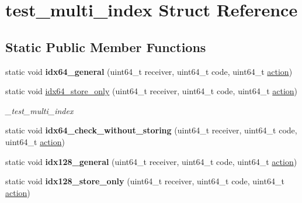 \hypertarget{structtest__multi__index}{}\section{test\+\_\+multi\+\_\+index Struct Reference}
\label{structtest__multi__index}
\subsection*{Static Public Member Functions}
\begin{DoxyCompactItemize}
\item 
\mbox{\label{structtest__multi__index_a7244f1007c22735c54df08b3b64c81fa}} 
static void {\bfseries idx64\+\_\+general} (uint64\+\_\+t receiver, uint64\+\_\+t code, uint64\+\_\+t \mbox{\hyperlink{structaacio_1_1action}{action}})
\item 
\mbox{\label{structtest__multi__index_a41a93c5b54e6c71f880b01b307ab96f7}} 
static void \mbox{\hyperlink{structtest__multi__index_a41a93c5b54e6c71f880b01b307ab96f7}{idx64\+\_\+store\+\_\+only}} (uint64\+\_\+t receiver, uint64\+\_\+t code, uint64\+\_\+t \mbox{\hyperlink{structaacio_1_1action}{action}})
\begin{DoxyCompactList}\small\item\em \+\_\+test\+\_\+multi\+\_\+index \end{DoxyCompactList}\item 
\mbox{\label{structtest__multi__index_a9ab3a1f016e2f50158c03b90adeb0dd7}} 
static void {\bfseries idx64\+\_\+check\+\_\+without\+\_\+storing} (uint64\+\_\+t receiver, uint64\+\_\+t code, uint64\+\_\+t \mbox{\hyperlink{structaacio_1_1action}{action}})
\item 
\mbox{\label{structtest__multi__index_a06c7b6e18e78fdafb8b59c2129d16bd8}} 
static void {\bfseries idx128\+\_\+general} (uint64\+\_\+t receiver, uint64\+\_\+t code, uint64\+\_\+t \mbox{\hyperlink{structaacio_1_1action}{action}})
\item 
\mbox{\label{structtest__multi__index_a1b038139e45eb627c3a50fdf437c5cd3}} 
static void {\bfseries idx128\+\_\+store\+\_\+only} (uint64\+\_\+t receiver, uint64\+\_\+t code, uint64\+\_\+t \mbox{\hyperlink{structaacio_1_1action}{action}})

\end{DoxyCompactItemize}
